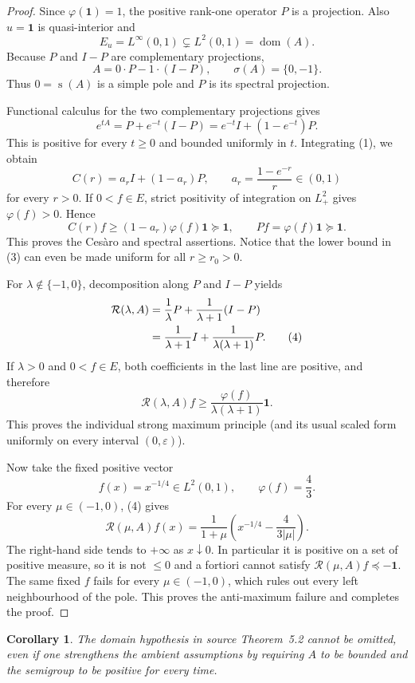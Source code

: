 \documentclass[11pt]{article}
\newtheorem{corollary}{Corollary}
\newcommand{\one}{\mathbf 1}
\newcommand{\R}{\mathcal R}
\newcommand{\dom}{\operatorname{dom}}
\newcommand{\spb}{\operatorname{s}}
\begin{document}
\begin{proof}
Since $\varphi(\one)=1$, the positive rank-one operator $P$ is a projection.
Also $u=\one$ is quasi-interior and
\[
 E_u=L^\infty(0,1)\subsetneq L^2(0,1)=\dom(A).
\]
Because $P$ and $I-P$ are complementary projections,
\[
 A=0\cdot P-1\cdot(I-P),
 \qquad \sigma(A)=\{0,-1\}.
\]
Thus $0=\spb(A)$ is a simple pole and $P$ is its spectral projection.

Functional calculus for the two complementary projections gives
\[
 e^{tA}=P+e^{-t}(I-P)
       =e^{-t}I+(1-e^{-t})P.                         \tag{1}
\]
This is positive for every $t\geq0$ and bounded uniformly in $t$.  Integrating
(1), we obtain
\[
 C(r)=a_r I+(1-a_r)P,
 \qquad a_r=\frac{1-e^{-r}}r\in(0,1)                \tag{2}
\]
for every $r>0$.  If $0<f\in E$, strict positivity of integration on
$L^2_+$ gives $\varphi(f)>0$.  Hence
\[
 C(r)f\geq(1-a_r)\varphi(f)\one\succeq\one,
 \qquad Pf=\varphi(f)\one\succeq\one.              \tag{3}
\]
This proves the Ces\`aro and spectral assertions.  Notice that the lower
bound in (3) can even be made uniform for all $r\geq r_0>0$.

For $\lambda\notin\{-1,0\}$, decomposition along $P$ and $I-P$ yields
\begin{align}
 \R(\lambda,A)
 &=\frac1\lambda P+\frac1{\lambda+1}(I-P)\notag\\
 &=\frac1{\lambda+1}I
   +\frac1{\lambda(\lambda+1)}P.                    \tag{4}
\end{align}
If $\lambda>0$ and $0<f\in E$, both coefficients in the last line are
positive, and therefore
\[
 \R(\lambda,A)f\geq
 \frac{\varphi(f)}{\lambda(\lambda+1)}\one.
\]
This proves the individual strong maximum principle (and its usual scaled
form uniformly on every interval $(0,\varepsilon)$).

Now take the fixed positive vector
\[
 f(x)=x^{-1/4}\in L^2(0,1),\qquad \varphi(f)=\frac43.
\]
For every $\mu\in(-1,0)$, (4) gives
\[
 \R(\mu,A)f(x)
 =\frac1{1+\mu}\left(x^{-1/4}-\frac{4}{3|\mu|}\right). \tag{5}
\]
The right-hand side tends to $+\infty$ as $x\downarrow0$.  In particular it
is positive on a set of positive measure, so it is not $\leq0$ and a fortiori
cannot satisfy $\R(\mu,A)f\preceq-\one$.  The same fixed $f$ fails for every
$\mu\in(-1,0)$, which rules out every left neighbourhood of the pole.  This
proves the anti-maximum failure and completes the proof.
\end{proof}

\begin{corollary}
The domain hypothesis in source Theorem~5.2 cannot be omitted, even if one
strengthens the ambient assumptions by requiring $A$ to be bounded and the
semigroup to be positive for every time.
\end{corollary}
\end{document}
